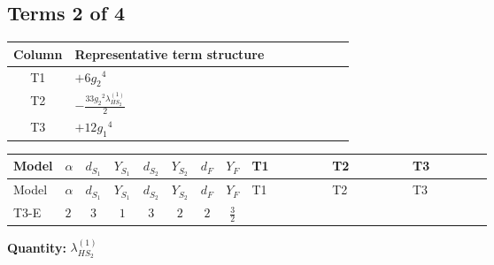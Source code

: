 \documentclass[8pt]{article}
\begin{document}
\begin{landscape}
\subsection*{Terms 2 of 4}
\begin{center}
\begin{tabular}{@{}c >{\raggedright\arraybackslash}p{0.82\linewidth}@{}}
\toprule
Column & Representative term structure \\
\midrule
T1 & \(\displaystyle +6 {g_2}^4\) \\
\midrule
T2 & \(\displaystyle -\frac{33 {g_2}^2 {\lambda_{HS_2}^{(1)}}}{2}\) \\
\midrule
T3 & \(\displaystyle +12 {g_1}^4\) \\
\midrule
\bottomrule
\end{tabular}
\end{center}
\smallskip
\tiny
\begin{longtable}{@{}llcccccc >{\raggedright\arraybackslash}p{0.21\linewidth} >{\raggedright\arraybackslash}p{0.21\linewidth} >{\raggedright\arraybackslash}p{0.21\linewidth}@{}}
\toprule
Model & $\alpha$ & $d_{S_1}$ & $Y_{S_1}$ & $d_{S_2}$ & $Y_{S_2}$ & $d_F$ & $Y_F$ & T1 & T2 & T3 \\
\midrule
\endfirsthead
\toprule
Model & $\alpha$ & $d_{S_1}$ & $Y_{S_1}$ & $d_{S_2}$ & $Y_{S_2}$ & $d_F$ & $Y_F$ & T1 & T2 & T3 \\
\midrule
\endhead
T3-E & $2$ & $3$ & $1$ & $3$ & $2$ & $2$ & $\frac{3}{2}$ & \scriptsize\adjustbox{max width=\linewidth}{$\begin{gathered} +6 {g_2}^4\end{gathered}$} & \scriptsize\adjustbox{max width=\linewidth}{$\begin{gathered} -\frac{33 {g_2}^2 {\lambda_{HS_2}^{(1)}}}{2}\end{gathered}$} & \scriptsize\adjustbox{max width=\linewidth}{$\begin{gathered} +12 {g_1}^4\end{gathered}$} \\
\midrule
\bottomrule
\end{longtable}
\clearpage
\noindent\textbf{Quantity: }$\lambda_{HS_2}^{(1)}$\par\smallskip

\end{landscape}
\end{document}
